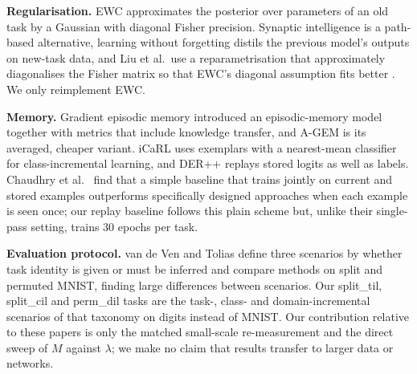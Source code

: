 \textbf{Regularisation.} EWC \cite{kirkpatrick2017overcoming} approximates the posterior over parameters of an old task by a Gaussian with diagonal Fisher precision. Synaptic intelligence \cite{zenke2017continual} is a path-based alternative, learning without forgetting \cite{li2018learning} distils the previous model's outputs on new-task data, and Liu et al.\ use a reparametrisation that approximately diagonalises the Fisher matrix so that EWC's diagonal assumption fits better \cite{liu2018rotate}. We only reimplement EWC.

\textbf{Memory.} Gradient episodic memory \cite{lopezpaz2017gradient} introduced an episodic-memory model together with metrics that include knowledge transfer, and A-GEM \cite{chaudhry2018efficient} is its averaged, cheaper variant. iCaRL \cite{rebuffi2017icarl} uses exemplars with a nearest-mean classifier for class-incremental learning, and DER++ \cite{buzzega2020dark} replays stored logits as well as labels. Chaudhry et al.\ \cite{chaudhry2019tiny} find that a simple baseline that trains jointly on current and stored examples outperforms specifically designed approaches when each example is seen once; our replay baseline follows this plain scheme but, unlike their single-pass setting, trains 30 epochs per task.

\textbf{Evaluation protocol.} van de Ven and Tolias \cite{ven2019three} define three scenarios by whether task identity is given or must be inferred and compare methods on split and permuted MNIST, finding large differences between scenarios. Our split\_til, split\_cil and perm\_dil tasks are the task-, class- and domain-incremental scenarios of that taxonomy on digits instead of MNIST. Our contribution relative to these papers is only the matched small-scale re-measurement and the direct sweep of $M$ against $\lambda$; we make no claim that results transfer to larger data or networks.
